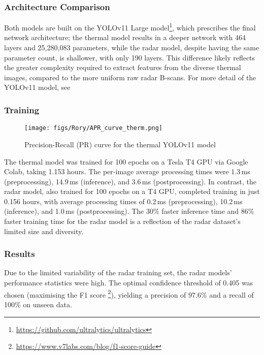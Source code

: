 \subsubsection{Architecture Comparison} \label{sec:cv_architecture_comparison}

Both models are built on the YOLOv11 Large model\footnote{\url{https://github.com/ultralytics/ultralytics}}, which prescribes the final network architecture; the thermal model results in a deeper network with 464 layers and 25,280,083 parameters, while the radar model, despite having the same parameter count, is shallower, with only 190 layers. This difference likely reflects the greater complexity required to extract features from the diverse thermal images, compared to the more uniform raw radar B-scans. For more detail of the YOLOv11 model, see \cite{khanam2024yolov11}

\subsubsection{Training} \label{sec:cv_training_comparison}


\begin{wrapfigure}{r}{0.35\textwidth} %
  \centering
  \texttt{[image: figs/Rory/APR\_curve\_therm.png]} %
  \caption{Precision-Recall (PR) curve for the thermal YOLOv11 model}
  \label{fig:pr_curve}
\end{wrapfigure}

The thermal model was trained for 100 epochs on a Tesla T4 GPU via Google Colab, taking 1.153 hours. The per-image average processing times were 1.3\,ms (preprocessing), 14.9\,ms (inference), and 3.6\,ms (postprocessing). In contrast, the radar model, also trained for 100 epochs on a T4 GPU, completed training in just 0.156 hours, with average processing times of 0.2\,ms (preprocessing), 10.2\,ms (inference), and 1.0\,ms (postprocessing). The 30\% faster inference time and 86\% faster training time for the radar model is a reflection of the radar dataset's limited size and diversity.

\subsubsection{Results} \label{sec:cv_results_comparison}

Due to the limited variability of the radar training set, the radar models' performance statistics were high. The optimal confidence threshold of 0.405 was chosen (maximising the F1 score \footnote{\url{https://www.v7labs.com/blog/f1-score-guide}}), yielding a precision of 97.6\% and a recall of 100\% on unseen data.

